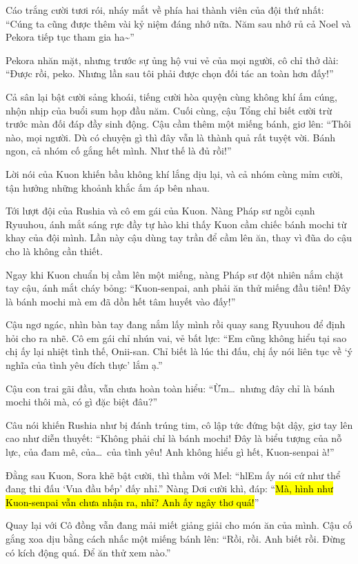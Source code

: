 \documentclass[../main.tex]{subfiles}
\begin{document}
Cáo trắng cười tươi rói, nháy mắt về phía hai thành viên của đội thứ nhất: ``Cúng ta cũng được thêm vài kỷ niệm đáng nhớ nữa. Năm sau nhớ rủ cả Noel và Pekora tiếp tục tham gia ha\~{}''

Pekora nhăn mặt, nhưng trước sự ủng hộ vui vẻ của mọi người, cô chỉ thở dài: ``Được rồi, peko. Nhưng lần sau tôi phải được chọn đối tác an toàn hơn đấy!''

Cả sân lại bật cười sảng khoái, tiếng cười hòa quyện cùng không khí ấm cúng, nhộn nhịp của buổi sum họp đầu năm. Cuối cùng, cậu Tổng chỉ biết cười trừ trước màn đối đáp đầy sinh động. Cậu cầm thêm một miếng bánh, giơ lên: ``Thôi nào, mọi người. Dù có chuyện gì thì đây vẫn là thành quả rất tuyệt vời. Bánh ngon, cả nhóm cố gắng hết mình. Như thế là đủ rồi!''

Lời nói của Kuon khiến bầu không khí lắng dịu lại, và cả nhóm cùng mỉm cười, tận hưởng những khoảnh khắc ấm áp bên nhau.

\ct

Tới lượt đội của Rushia và cô em gái của Kuon. Nàng Pháp sư ngồi cạnh Ryuuhou, ánh mắt sáng rực đầy tự hào khi thấy Kuon cầm chiếc bánh mochi từ khay của đội mình. Lần này cậu dùng tay trần để cầm lên ăn, thay vì đũa do cậu cho là không cần thiết.

Ngay khi Kuon chuẩn bị cầm lên một miếng, nàng Pháp sư đột nhiên nắm chặt tay cậu, ánh mắt cháy bỏng: ``Kuon-senpai, anh phải ăn thử miếng đầu tiên! Đây là bánh mochi mà em đã dồn hết tâm huyết vào đấy!''

Cậu ngơ ngác, nhìn bàn tay đang nắm lấy mình rồi quay sang Ryuuhou để định hỏi cho ra nhẽ. Cô em gái chỉ nhún vai, vẻ bất lực: ``Em cũng không hiểu tại sao chị ấy lại nhiệt tình thế, Onii-san. Chỉ biết là lúc thi đấu, chị ấy nói liên tục về `ý nghĩa của tình yêu đích thực' lắm ạ.''

Cậu con trai gãi đầu, vẫn chưa hoàn toàn hiểu: ``Ừm\dots\ nhưng đây chỉ là bánh mochi thôi mà, có gì đặc biệt đâu?''

Câu nói khiến Rushia như bị đánh trúng tim, cô lập tức đứng bật dậy, giơ tay lên cao như diễn thuyết: ``Không phải chỉ là bánh mochi! Đây là biểu tượng của nỗ lực, của đam mê, của\dots\ của tình yêu! Anh không hiểu gì hết, Kuon-senpai à!''

Đằng sau Kuon, Sora khẽ bật cười, thì thầm với Mel: ``hlEm ấy nói cứ như thể đang thi đấu `Vua đầu bếp' đấy nhỉ.'' Nàng Dơi cười khì, đáp: ``\hl{Mà, hình như Kuon-senpai vẫn chưa nhận ra, nhỉ? Anh ấy ngây thơ quá!}''

Quay lại với Cô đồng vẫn đang mải miết giảng giải cho món ăn của mình. Cậu cố gắng xoa dịu bằng cách nhấc một miếng bánh lên: ``Rồi, rồi. Anh biết rồi. Đừng có kích động quá. Để ăn thử xem nào.''
\end{document}
